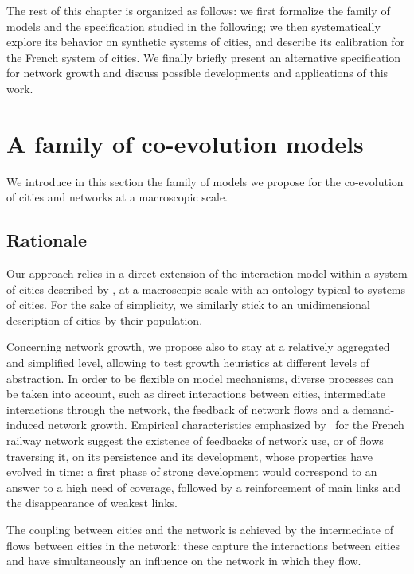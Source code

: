 \documentclass[11pt]{article}
\begin{document}
The rest of this chapter is organized as follows: we first formalize the family of models and the specification studied in the following; we then systematically explore its behavior on synthetic systems of cities, and describe its calibration for the French system of cities. We finally briefly present an alternative specification for network growth and discuss possible developments and applications of this work.


\section{A family of co-evolution models}

We introduce in this section the family of models we propose for the co-evolution of cities and networks at a macroscopic scale.


\subsection{Rationale}

Our approach relies in a direct extension of the interaction model within a system of cities described by \cite{raimbault2018indirect}, at a macroscopic scale with an ontology typical to systems of cities. For the sake of simplicity, we similarly stick to an unidimensional description of cities by their population.


Concerning network growth, we propose also to stay at a relatively aggregated and simplified level, allowing to test growth heuristics at different levels of abstraction. In order to be flexible on model mechanisms, diverse processes can be taken into account, such as direct interactions between cities, intermediate interactions through the network, the feedback of network flows and a demand-induced network growth. Empirical characteristics emphasized by~\cite{thevenin2013mapping} for the French railway network suggest the existence of feedbacks of network use, or of flows traversing it, on its persistence and its development, whose properties have evolved in time: a first phase of strong development would correspond to an answer to a high need of coverage, followed by a reinforcement of main links and the disappearance of weakest links.


The coupling between cities and the network is achieved by the intermediate of flows between cities in the network: these capture the interactions between cities and have simultaneously an influence on the network in which they flow.
\end{document}
